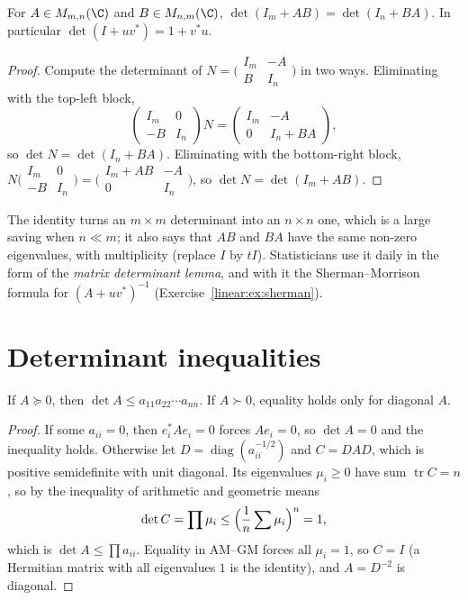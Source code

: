 \begin{proposition}\label{linear:prop:detIAB}
For $A\in M_{m,n}(\C)$ and $B\in M_{n,m}(\C)$, $\det(I_m+AB)=\det(I_n+BA)$. In particular $\det(I+uv^*)=1+v^*u$.
\end{proposition}
\begin{proof}
Compute the determinant of $N=\bigl(\begin{smallmatrix}I_m&-A\\B&I_n\end{smallmatrix}\bigr)$ in two ways. Eliminating with the top-left block,
\[
\begin{pmatrix}I_m&0\\-B&I_n\end{pmatrix}N=\begin{pmatrix}I_m&-A\\0&I_n+BA\end{pmatrix},
\]
so $\det N=\det(I_n+BA)$. Eliminating with the bottom-right block, $N\bigl(\begin{smallmatrix}I_m&0\\-B&I_n\end{smallmatrix}\bigr)=
\bigl(\begin{smallmatrix}I_m+AB&-A\\0&I_n\end{smallmatrix}\bigr)$, so $\det N=\det(I_m+AB)$.
\end{proof}

The identity turns an $m\times m$ determinant into an $n\times n$ one, which is a large saving when $n\ll m$; it also says that $AB$ and
$BA$ have the same non-zero eigenvalues, with multiplicity (replace $I$ by $tI$). Statisticians use it daily in the form of the
\emph{matrix determinant lemma}, and with it the Sherman--Morrison formula for $(A+uv^*)^{-1}$ (Exercise~\ref{linear:ex:sherman}).

\section{Determinant inequalities}

\begin{theorem}\label{linear:thm:hadamard}
If $A\succeq0$, then $\det A\le a_{11}a_{22}\cdots a_{nn}$. If $A\succ0$, equality holds only for diagonal $A$.
\end{theorem}
\begin{proof}
If some $a_{ii}=0$, then $e_i^*Ae_i=0$ forces $Ae_i=0$, so $\det A=0$ and the inequality holds. Otherwise let $D=\operatorname{diag}(a_{ii}^
{-1/2})$ and $C=DAD$, which is positive semidefinite with unit diagonal. Its eigenvalues $\mu_i\ge0$ have sum $\operatorname{tr}C=n$,
so by the inequality of arithmetic and geometric means
\[
\det C=\prod\mu_i\le\Bigl(\frac1n\sum\mu_i\Bigr)^n=1,
\]
which is $\det A\le\prod a_{ii}$. Equality in AM--GM forces all $\mu_i=1$, so $C=I$ (a Hermitian matrix with all eigenvalues $1$ is
the identity), and $A=D^{-2}$ is diagonal.
\end{proof}

